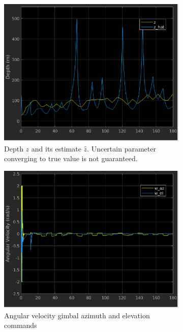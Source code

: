 \begin{figure}[htbp]
	\centering
	\begin{subfigure}{0.5\textwidth}
		\centering
		\includegraphics[width=0.9\linewidth]{images/chapter2/uav_z}
		\caption{Depth $z$ and its estimate $\hat{z}$. Uncertain parameter converging to true value is not guaranteed.}
	\end{subfigure}%
	\begin{subfigure}{0.5\textwidth}
		\centering
		\includegraphics[width=0.9\linewidth]{images/chapter2/uav_gimbal_command}
		\caption{Angular velocity gimbal azimuth and elevation commands}
	\end{subfigure}
	\begin{subfigure}{0.5\textwidth}
		\centering

\end{subfigure}
\end{figure}
